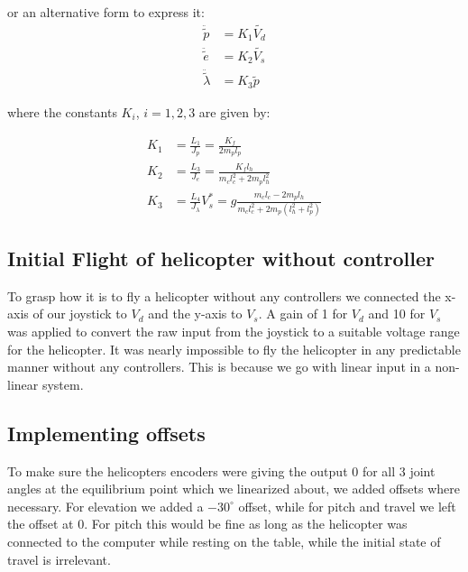 or an alternative form to express it:
\begin{subequations}\label{eq:lin_trans_motion}
    \begin{aligned}
        \ddot{\tilde{p}} &= K_{1} \tilde{V_{d}}
        \label{eq:lin_mot_pitch} \\
        \ddot{\tilde{e}} &= K_{2} \tilde{V_{s}}
        \label{eq:lin_mot_elev} \\
        \ddot{\tilde{\lambda}} &= K_{3} \tilde{p}
        \label{eq:lin_mot_travel}
    \end{aligned}
\end{subequations}

where the constants $K_i$, $i = {1, 2, 3}$ are given by:

\begin{subequations}\label{const:K}
    \begin{align}
        K_{1} &= \frac{L_{1}}{J_{p}} = \frac{K_{f}}{2 m_{p} l_{p}} 
        \label{const:K_1}  \\
        K_{2} &= \frac{L_{3}}{J_{e}} = \frac{K_{f} l_{h}}{m_{c} l_{c}^2 + 2 m_{p} l_{h}^2}
        \label{const:K_2} \\
        K_{3} &= \frac{L_4}{J_\lambda} V_s^* = g \frac{m_{c} l_{c} - 2 m_{p} l_{h}}{m_{c} l_{c}^2 + 2 m_{p} (l_{h}^2 + l_{p}^2)} 
        \label{const:K_3}
    \end{align}
\end{subequations}


\subsection{Initial Flight of helicopter without controller}
To grasp how it is to fly a helicopter without any controllers we connected the x-axis of our joystick to $V_d$ and the y-axis to $V_s$. A gain of 1 for $V_d$ and 10 for $V_s$ was applied to convert the raw input from the joystick to a suitable voltage range for the helicopter.
It was nearly impossible to fly the helicopter in any predictable manner without any controllers. This is because we go with linear input in a non-linear system.

\subsection{Implementing offsets}
To make sure the helicopters encoders were giving the output 0 for all 3 joint angles at the equilibrium point which we linearized about, we added offsets where necessary. For elevation we added a $-30^\circ$ offset, while for pitch and travel we left the offset at 0. For pitch this would be fine as long as the helicopter was connected to the computer while resting on the table, while the initial state of travel is irrelevant.

